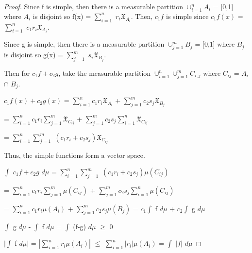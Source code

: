     \begin{proof}
        Since f is simple, then there is a measurable partition
        $\cup_{i=1}^n A_i$ = [0,1] where $A_i$ is disjoint
        so f(x) = $\sum_{i=1}^n$ $r_i \mathfrak{X}_{A_i}$.
        Then, $c_1f$ is simple since
        $c_1f(x)$ = $\sum_{i=1}^n$ $c_1r_i \mathfrak{X}_{A_i}$.

        Since g is simple, then there is a measurable partition
        $\cup_{j=1}^m B_j$ = [0,1] where $B_j$ is disjoint
        so g(x) = $\sum_{j=1}^m$ $s_i \mathfrak{X}_{B_j}$.

        Then for $c_1f + c_2g$, take the measurable partition
        $\cup_{i=1}^n \cup_{j=1}^m C_{i,j}$ where $C_{ij}$ = $A_i$ $\cap$ $B_j$.

        \hspace{0.5cm}
        $c_1f(x) + c_2g(x)$
        = $\sum_{i=1}^n c_1r_i \mathfrak{X}_{A_i}$
            + $\sum_{j=1}^m c_2s_j \mathfrak{X}_{B_j}$

        \hspace{3.4cm}
        = $\sum_{i=1}^n c_1r_i \sum_{j=1}^m \mathfrak{X}_{C_{ij}}$
            + $\sum_{j=1}^m c_2s_j \sum_{i=1}^n \mathfrak{X}_{C_{ij}}$

        \hspace{3.4cm}
        = $\sum_{i=1}^n \sum_{j=1}^m$ $(c_1r_i + c_2s_j)\mathfrak{X}_{C_{ij}}$

        Thus, the simple functions form a vector space.

        \hspace{0.5cm}
        $\int$ $c_1f+c_2g$ $d\mu$
        = $\sum_{i=1}^n \sum_{j=1}^m$ $(c_1r_i + c_2s_j)\mu(C_{ij})$

        \hspace{3.3cm}
        = $\sum_{i=1}^n c_1r_i \sum_{j=1}^m \mu(C_{ij})$
            + $\sum_{j=1}^m c_2s_j \sum_{i=1}^n \mu(C_{ij})$

        \hspace{3.3cm}
        = $\sum_{i=1}^n c_1r_i \mu(A_i)$
            + $\sum_{j=1}^m c_2s_j \mu(B_j)$
        = $c_1 \int$ f $d\mu$ + $c_2 \int$ g $d\mu$

        \hspace{0.5cm}
        $\int$ g $d\mu$ - $\int$ f $d\mu$
        = $\int$ (f-g) $d\mu$
        $\geq$ 0

        \hspace{0.5cm}
        $|\int$ f $d\mu|$
        = $|\sum_{i=1}^n r_i \mu(A_i)|$
        $\leq$ $\sum_{i=1}^n |r_i| \mu(A_i)$
        = $\int$ $|f|$ $d\mu$
    \end{proof}

